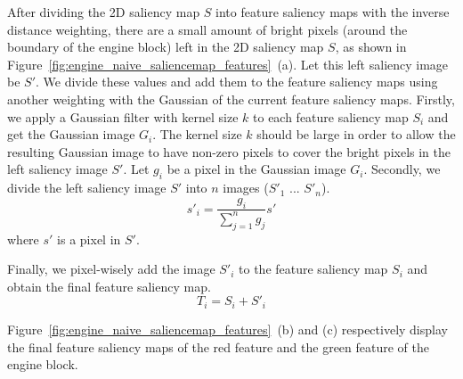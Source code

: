 After dividing the 2D saliency map $ S $ into feature saliency maps with the inverse distance weighting, there are a small amount of bright pixels (around the boundary of the engine block) left in the 2D saliency map $ S $, as shown in Figure~\ref{fig:engine_naive_saliencemap_features}~(a). Let this left saliency image be $ S' $.
We divide these values and add them to the feature saliency maps using another weighting with the Gaussian of the current feature saliency maps.
Firstly, we apply a Gaussian filter with kernel size $ k $ to each feature saliency map $ S_{i} $ and get the Gaussian image $ G_{i} $.
The kernel size $ k $ should be large in order to allow the resulting Gaussian image to have non-zero pixels to cover the bright pixels in the left saliency image $ S' $.
Let $ g_{i} $ be a pixel in the Gaussian image $ G_{i} $.
Secondly, we divide the left saliency image $ S' $ into $ n $ images ($ S'_{1} $ ... $ S'_{n} $).
\[ s'_{i} = \frac{ g_{i} }{ \sum_{j=1}^{n} g_{j} }s' \]
where $ s' $ is a pixel in $ S' $.

Finally, we pixel-wisely add the image $ S'_{i} $ to the feature saliency map $ S_{i} $ and obtain the final feature saliency map.
\[ T_{i} =S_{i}+S'_{i}\]

Figure~\ref{fig:engine_naive_saliencemap_features}~(b) and (c) respectively display the final feature saliency maps of the red feature and the green feature of the engine block.

